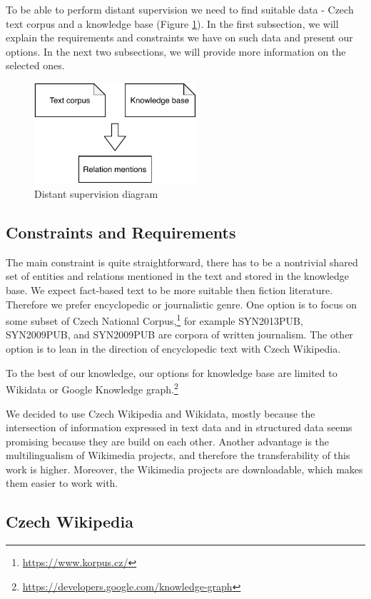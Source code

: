 To be able to perform distant supervision we need to find suitable data - Czech text corpus and a knowledge base (Figure \ref{obr03:DSD}). In the first subsection, we will explain the requirements and constraints we have on such data and present our options. In the next two subsections, we will provide more information on the selected ones.

\begin{figure}[h]\centering
\includegraphics[width=60mm]{./img//Diplomka diagramy-Distant supervision}
\caption{Distant supervision diagram}
\label{obr03:DSD}
\end{figure}


\subsection{Constraints and Requirements}
The main constraint is quite straightforward, there has to be a nontrivial shared set of entities and relations mentioned in the text and stored in the knowledge base. We expect fact-based text to be more suitable then fiction literature. Therefore we prefer encyclopedic or journalistic genre. One option is to focus on some subset of Czech National Corpus,\footnote{\url{https://www.korpus.cz/}} for example SYN2013PUB, SYN2009PUB, and SYN2009PUB are corpora of written journalism. The other option is to lean in the direction of encyclopedic text with Czech Wikipedia.

To the best of our knowledge, our options for knowledge base are limited to Wikidata or Google Knowledge graph.\footnote{\url{https://developers.google.com/knowledge-graph}}

We decided to use Czech Wikipedia and Wikidata, mostly because the intersection of information expressed in text data and in structured data seems promising because they are build on each other. Another advantage is the multilingualism of Wikimedia projects, and therefore the transferability of this work is higher. Moreover, the Wikimedia projects are downloadable, which makes them easier to work with.


\subsection{Czech Wikipedia}

